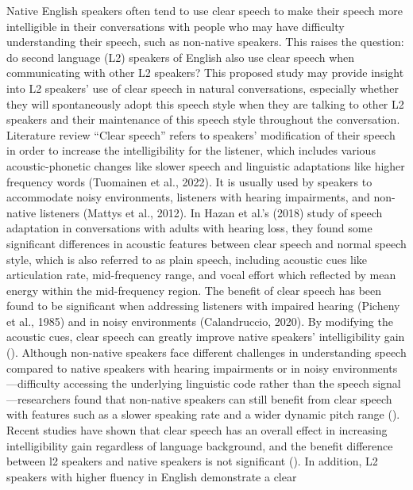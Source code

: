 \documentclass[
  man,
  floatsintext,
  longtable,
  nolmodern,
  notxfonts,
  notimes,
  colorlinks=true,linkcolor=blue,citecolor=blue,urlcolor=blue]{apa7}
\begin{document}
Native English speakers often tend to use clear speech to make their
speech more intelligible in their conversations with people who may have
difficulty understanding their speech, such as non-native speakers. This
raises the question: do second language (L2) speakers of English also
use clear speech when communicating with other L2 speakers? This
proposed study may provide insight into L2 speakers' use of clear speech
in natural conversations, especially whether they will spontaneously
adopt this speech style when they are talking to other L2 speakers and
their maintenance of this speech style throughout the conversation.
Literature review ``Clear speech'' refers to speakers' modification of
their speech in order to increase the intelligibility for the listener,
which includes various acoustic-phonetic changes like slower speech and
linguistic adaptations like higher frequency words (Tuomainen et al.,
2022). It is usually used by speakers to accommodate noisy environments,
listeners with hearing impairments, and non-native listeners (Mattys et
al., 2012). In Hazan et al.'s (2018) study of speech adaptation in
conversations with adults with hearing loss, they found some significant
differences in acoustic features between clear speech and normal speech
style, which is also referred to as plain speech, including acoustic
cues like articulation rate, mid-frequency range, and vocal effort which
reflected by mean energy within the mid-frequency region. The benefit of
clear speech has been found to be significant when addressing listeners
with impaired hearing (Picheny et al., 1985) and in noisy environments
(Calandruccio, 2020). By modifying the acoustic cues, clear speech can
greatly improve native speakers' intelligibility gain
(). Although
non-native speakers face different challenges in understanding speech
compared to native speakers with hearing impairments or in noisy
environments---difficulty accessing the underlying linguistic code
rather than the speech signal---researchers found that non-native
speakers can still benefit from clear speech with features such as a
slower speaking rate and a wider dynamic pitch range
(). Recent
studies have shown that clear speech has an overall effect in increasing
intelligibility gain regardless of language background, and the benefit
difference between l2 speakers and native speakers is not significant
(). In
addition, L2 speakers with higher fluency in English demonstrate a clear
\end{document}
